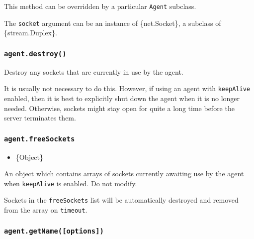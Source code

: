 \begin{Shaded}
\begin{Highlighting}[]
\NormalTok{()}\OperatorTok{;}
\end{Highlighting}
\end{Shaded}

This method can be overridden by a particular \texttt{Agent} subclass.

The \texttt{socket} argument can be an instance of \{net.Socket\}, a
subclass of \{stream.Duplex\}.

\subsubsection{\texorpdfstring{\texttt{agent.destroy()}}{agent.destroy()}}\label{agent.destroy}

Destroy any sockets that are currently in use by the agent.

It is usually not necessary to do this. However, if using an agent with
\texttt{keepAlive} enabled, then it is best to explicitly shut down the
agent when it is no longer needed. Otherwise, sockets might stay open
for quite a long time before the server terminates them.

\subsubsection{\texorpdfstring{\texttt{agent.freeSockets}}{agent.freeSockets}}\label{agent.freesockets}

\begin{itemize}
\tightlist
\item
  \{Object\}
\end{itemize}

An object which contains arrays of sockets currently awaiting use by the
agent when \texttt{keepAlive} is enabled. Do not modify.

Sockets in the \texttt{freeSockets} list will be automatically destroyed
and removed from the array on
\texttt{\textquotesingle{}timeout\textquotesingle{}}.

\subsubsection{\texorpdfstring{\texttt{agent.getName({[}options{]})}}{agent.getName({[}options{]})}}\label{agent.getnameoptions}


